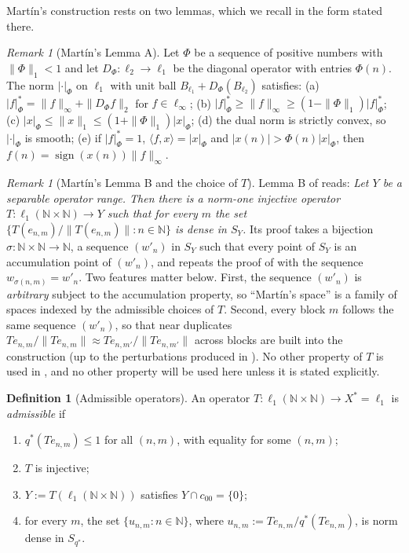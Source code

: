 \documentclass[10pt]{amsart}
\theoremstyle{definition}
\newtheorem{definition}[theorem]{Definition}
\theoremstyle{remark}
\newtheorem{remark}[theorem]{Remark}
\newcommand{\sgn}{\operatorname{sign}}
\newcommand{\N}{\mathbb N}
\newcommand{\ip}[2]{\langle #1,#2\rangle}
\begin{document}
Mart\'in's construction \cite{Martin} rests on two lemmas, which we recall
in the form stated there.

\begin{remark}[Mart\'in's Lemma A]\label{rem:lemmaA}
Let $\Phi$ be a sequence of positive numbers with $\|\Phi\|_1<1$ and let
$D_\Phi:\ell_2\to\ell_1$ be the diagonal operator with entries $\Phi(n)$.
The norm $|\cdot|_\Phi$ on $\ell_1$ with unit ball
$B_{\ell_1}+D_\Phi(B_{\ell_2})$ satisfies:
(a) $|f|_\Phi^*=\|f\|_\infty+\|D_\Phi f\|_2$ for $f\in\ell_\infty$;
(b) $|f|^*_\Phi\geq\|f\|_\infty\geq(1-\|\Phi\|_1)|f|^*_\Phi$;
(c) $|x|_\Phi\leq\|x\|_1\leq(1+\|\Phi\|_1)|x|_\Phi$;
(d) the dual norm is strictly convex, so $|\cdot|_\Phi$ is smooth;
(e) if $|f|^*_\Phi=1$, $\ip{f}{x}=|x|_\Phi$ and $|x(n)|>\Phi(n)|x|_\Phi$,
then $f(n)=\sgn(x(n))\|f\|_\infty$.
\end{remark}

\begin{remark}[Mart\'in's Lemma B and the choice of $T$]\label{rem:lemmaB}
Lemma B of \cite{Martin} reads: \emph{Let $Y$ be a separable operator
range.  Then there is a norm-one injective operator
$T:\ell_1(\N\times\N)\to Y$ such that for every $m$ the set
$\{T(e_{n,m})/\|T(e_{n,m})\|:n\in\N\}$ is dense in $S_Y$.}
Its proof takes a bijection $\sigma:\N\times\N\to\N$, a sequence
$(w'_n)$ in $S_Y$ such that every point of $S_Y$ is an accumulation point
of $(w'_n)$, and repeats the proof of \cite[Proposition~2.8]{KLMW20} with
the sequence $w_{\sigma(n,m)}=w'_n$.  Two features matter below.  First,
the sequence $(w'_n)$ is \emph{arbitrary} subject to the accumulation
property, so ``Mart\'in's space'' is a family of spaces indexed by the
admissible choices of $T$.  Second, every block $m$ follows the same
sequence $(w'_n)$, so that near duplicates $Te_{n,m}/\|Te_{n,m}\|\approx
Te_{n,m'}/\|Te_{n,m'}\|$ across blocks are built into the construction (up
to the perturbations produced in \cite{KLMW20}).  No other property of $T$
is used in \cite{Martin}, and no other property will be used here unless
it is stated explicitly.
\end{remark}

\begin{definition}[Admissible operators]\label{def:admissible}
An operator $T:\ell_1(\N\times\N)\to X^*=\ell_1$ is \emph{admissible} if
\begin{enumerate}
\item[(T-a)] $q^*(Te_{n,m})\le1$ for all $(n,m)$, with equality for some
$(n,m)$;
\item[(T-b)] $T$ is injective;
\item[(T-c)] $Y:=T(\ell_1(\N\times\N))$ satisfies $Y\cap c_{00}=\{0\}$;
\item[(T-d)] for every $m$, the set $\{u_{n,m}:n\in\N\}$, where
$u_{n,m}:=Te_{n,m}/q^*(Te_{n,m})$, is norm dense in $S_{q^*}$.
\end{enumerate}
\end{definition}
\end{document}

